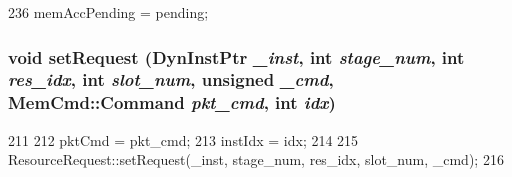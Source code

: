 \begin{DoxyCode}
236 { memAccPending = pending; }
\end{DoxyCode}
\hypertarget{classCacheRequest_a84f6f3e65e793185ef653dd30dc70bce}{
\subsubsection[{setRequest}]{\setlength{\rightskip}{0pt plus 5cm}void setRequest ({\bf DynInstPtr} {\em \_\-inst}, \/  int {\em stage\_\-num}, \/  int {\em res\_\-idx}, \/  int {\em slot\_\-num}, \/  unsigned {\em \_\-cmd}, \/  {\bf MemCmd::Command} {\em pkt\_\-cmd}, \/  int {\em idx})}}
\label{classCacheRequest_a84f6f3e65e793185ef653dd30dc70bce}



\begin{DoxyCode}
211     {
212         pktCmd = pkt_cmd;
213         instIdx = idx;
214 
215         ResourceRequest::setRequest(_inst, stage_num, res_idx, slot_num, _cmd);
216     }
\end{DoxyCode}


